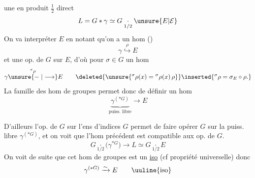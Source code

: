 une  en produit $\frac12$ direct
\[
L=G*\gamma\simeq G\underset{1/2}{\cdot}\unsure{E|\mathcal E}
\]
On va interpréter $E$ en notant qu'on a un hom ()
\[
\gamma \overset{\rho}{\hookrightarrow} E
\]
et une op. de $G$ sur $E$, d'où pour $\sigma\in G$ un hom
\[
\gamma\overset{{}^{\sigma}\rho}{\unsure{\mathrel{\relbar}|\longrightarrow}}E\qquad
\deleted{\unsure{{}^{\sigma}\rho(x)={}^{\sigma}\rho(x)\,\rho}}
\inserted{{}^{\sigma}\rho=\sigma_E\circ\rho.}
\]
La famille des hom de groupes permet donc de définir un hom
\[
\underbrace{\gamma^{(*G)}}_{\text{puiss. libre}}\longrightarrow E
\]

D'ailleurs l'op. de $G$ sur l'ens d'indices $G$ permet de faire opérer $G$ sur la puiss. libre $\gamma^{(*G)}$, et  on voit que l'hom précédent est compatible aux op. de $G$.  
\[
G\underset{1/2}{\cdot}\bigl(\gamma^{*G}\bigr)\longrightarrow L\simeq
G\underset{1/2}{\cdot}E
\]
On voit de suite que cet hom de groupes est un \uline{iso} (cf propriété universelle) donc
\[
\gamma^{(*G)}\xrightarrow{\sim}E\qquad \text{\uuline{iso}}
\]
